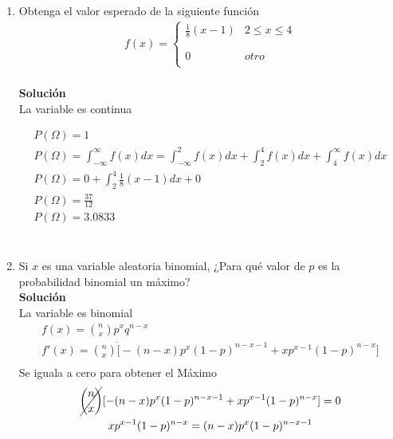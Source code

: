 \begin{enumerate}
    \item Obtenga el valor esperado de la siguiente función\\
    \begin{gather*}
    f(x)= \left\{ \begin{array}{lcc}
    \frac{1}{8}(x - 1) & 2 \leq x \leq 4 \\\\
    \\0  & otro \\
    \end{array}
    \right.
    \end{gather*}\\
    \textbf{Solución}\\
    La variable es continua\\
    \begin{center}
        \begin{gather*}
        P(\Omega) = 1\\
        P(\Omega) = \int_{-\infty}^{\infty} f(x)dx = \int_{-\infty}^{2} f(x)dx + \int_{2}^{4} f(x)dx + \int_{4}^{\infty} f(x)dx\\
        P(\Omega) = 0 + \int_{2}^{4}\frac{1}{8}(x - 1) dx + 0\\
        P(\Omega) = \frac{37}{12}\\
        P(\Omega) = 3.0833\\
        \end{gather*}\\
    \end{center}
    \item Si $x$ es una variable aleatoria binomial, ¿Para qué valor de $p$ es la probabilidad binomial un máximo?\\
    \textbf{Solución}\\
    La variable es binomial\\
    \begin{gather*}
    f(x) = {n \choose x}p^xq^{n-x}\\
    f'(x) =  {n \choose x}\dot[-(n-x)p^x(1-p)^{n-x-1} + xp^{x-1}(1 - p)^{n-x}]\\
    \end{gather*}
    Se iguala a cero para obtener el Máximo
    \begin{gather*}
    \displaystyle\cancel{{n \choose x}}[-(n-x)p^x(1 - p)^{n-x-1} + xp^{x-1}(1 - p)^{n-x}] = 0\\
    xp^{x-1}(1 - p)^{n-x} = (n-x)p^x(1 - p)^{n-x-1}\\

\end{gather*}
\end{enumerate}
